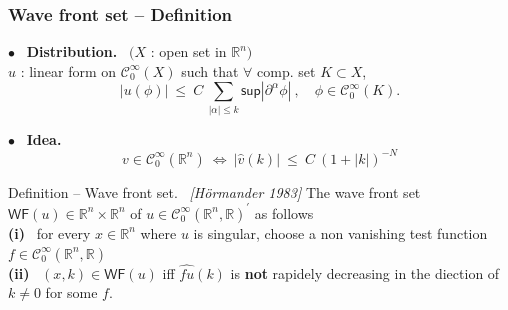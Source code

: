 \documentclass[9pt]{beamer}
\newcommand{\abs}[1]{\left|{#1}\right|} %
\renewcommand{\sup}{\mathsf{sup}} %
\newcommand{\WF}{\mathsf{WF}} %
\newcommand{\citebeam}[1]{\textit{\textcolor{black!60!white}{[#1]}}} %
\newcommand{\Ccal}{\mathcal{C}}
\newcommand{\Rbb}{\mathbb{R}}
\begin{document}
\begin{frame}

\frametitle{Wave front set -- Definition}

\vfill

$\bullet$ \ \textbf{Distribution.} \ $\big( X$ : open set in $\Rbb^n \big)$ \\
$u$ : linear form on $\Ccal^\infty_0(X)$ such that $\forall$ comp. set $K \subset X$,
\vspace*{-6pt}
\begin{equation*}
\abs{u(\phi)} \ \leq \ C \ \sum_{\abs{\alpha} \leq k} \sup\abs{\partial^\alpha \phi}   \ , \quad \phi \in \Ccal^\infty_0(K) .
\end{equation*}

\vfill

$\bullet$ \ \textbf{Idea.} 
\vspace*{-6pt}
\begin{equation*}
v \in \Ccal^\infty_0(\Rbb^n) \ \Leftrightarrow \ \abs{\hat{v}(k)} \ \leq \ C \ \left( 1 + \abs{k} \right)^{-N} 
\end{equation*}

\vfill

\begin{block}{Definition -- Wave front set. \ \citebeam{Hörmander 1983}}
 The wave front set $\WF(u) \in \Rbb^n \times \Rbb^n$ of $u \in \Ccal^\infty_0(\Rbb^n, \Rbb)^\prime$ as follows \\[2pt]
\qquad \textbf{(i)} \ for every $x \in \Rbb^n$ where $u$ is singular, choose a non vanishing test function $f \in \Ccal^\infty_0(\Rbb^n, \Rbb)$ \\[2pt]
\qquad \textbf{(ii)} \ $(x,k) \in \WF(u)$ iff $\hat{fu}(k)$ is \textbf{not} rapidely decreasing in the diection of $k \neq 0$ for some $f$.
\end{block}

\vfill

\end{frame}
\end{document}

